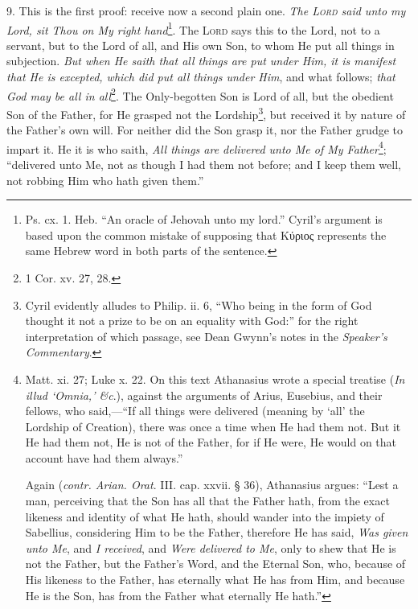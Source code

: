 9. This is the first proof: receive now a second plain one. \emph{The \textsc{Lord} said unto my Lord, sit Thou on My right hand}\footnote{Ps. cx. 1. Heb. “An oracle of Jehovah unto my lord.” Cyril’s argument is based upon the common mistake of supposing that \textgreek{Κύριος} represents the same Hebrew word in both parts of the sentence.}. The \textsc{Lord} says this to the Lord, not to a servant, but to the Lord of all, and His own Son, to whom He put all things in subjection. \emph{But when He saith that all things are put under Him, it is manifest that He is excepted, which did put all things under Him}, and what follows; \emph{that God may be all in all}\footnote{1 Cor. xv. 27, 28.}. The Only-begotten Son is Lord of all, but the obedient Son of the Father, for He grasped not the Lordship\footnote{Cyril evidently alludes to Philip. ii. 6, “Who being in the form of God thought it not a prize to be on an equality with God:” for the right interpretation of which passage, see Dean Gwynn’s notes in the \emph{Speaker’s Commentary}.}, but received it by nature of the Father’s own will. For neither did the Son grasp it, nor the Father grudge to impart it. He it is who saith, \emph{All things are delivered unto Me of My Father}\footnote{Matt. xi. 27; Luke x. 22. On this text Athanasius wrote a special treatise (\emph{In illud ‘Omnia,’ \&c}.), against the arguments of Arius, Eusebius, and their fellows, who said,—“If all things were delivered (meaning by ‘all’ the Lordship of Creation), there was once a time when He had them not. But it He had them not, He is not of the Father, for if He were, He would on that account have had them always.” \par Again (\emph{contr. Arian. Orat}. III. cap. xxvii. § 36), Athanasius argues: “Lest a man, perceiving that the Son has all that the Father hath, from the exact likeness and identity of what He hath, should wander into the impiety of Sabellius, considering Him to be the Father, therefore He has said, \emph{Was given unto Me}, and \emph{I received}, and \emph{Were delivered to Me}, only to shew that He is not the Father, but the Father’s Word, and the Eternal Son, who, because of His likeness to the Father, has eternally what He has from Him, and because He is the Son, has from the Father what eternally He hath.”}; “delivered unto Me, not as though I had them not before; and I keep them well, not robbing Him who hath given them.”

